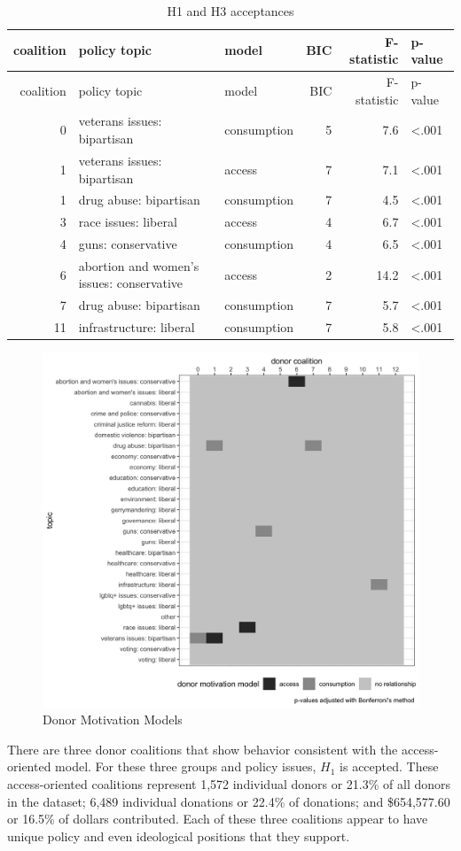\documentclass[12pt,]{article}
\begin{document}
\begin{longtable}[]{@{}rllrrl@{}}
\caption{H1 and H3 acceptances}\tabularnewline
\toprule
coalition & policy topic & model & BIC & F-statistic &
p-value\tabularnewline
\midrule
\endfirsthead
\toprule
coalition & policy topic & model & BIC & F-statistic &
p-value\tabularnewline
\midrule
\endhead
0 & veterans issues: bipartisan & consumption & 5 & 7.6 &
\textless.001\tabularnewline
1 & veterans issues: bipartisan & access & 7 & 7.1 &
\textless.001\tabularnewline
1 & drug abuse: bipartisan & consumption & 7 & 4.5 &
\textless.001\tabularnewline
3 & race issues: liberal & access & 4 & 6.7 &
\textless.001\tabularnewline
4 & guns: conservative & consumption & 4 & 6.5 &
\textless.001\tabularnewline
6 & abortion and women's issues: conservative & access & 2 & 14.2 &
\textless.001\tabularnewline
7 & drug abuse: bipartisan & consumption & 7 & 5.7 &
\textless.001\tabularnewline
11 & infrastructure: liberal & consumption & 7 & 5.8 &
\textless.001\tabularnewline
\bottomrule
\end{longtable}

\begin{figure}
\centering
\includegraphics{../tables_and_figures/fig_2.jpg}
\caption{Donor Motivation Models}
\end{figure}

There are three donor coalitions that show behavior consistent with the
access-oriented model. For these three groups and policy issues,
\(H_{1}\) is accepted. These access-oriented coalitions represent 1,572
individual donors or 21.3\% of all donors in the dataset; 6,489
individual donations or 22.4\% of donations; and \$654,577.60 or 16.5\%
of dollars contributed. Each of these three coalitions appear to have
unique policy and even ideological positions that they support.
\end{document}
